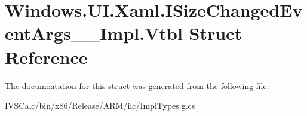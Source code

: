 \hypertarget{struct_windows_1_1_u_i_1_1_xaml_1_1_i_size_changed_event_args_____impl_1_1_vtbl}{}\section{Windows.\+U\+I.\+Xaml.\+I\+Size\+Changed\+Event\+Args\+\_\+\+\_\+\+Impl.\+Vtbl Struct Reference}
\label{struct_windows_1_1_u_i_1_1_xaml_1_1_i_size_changed_event_args_____impl_1_1_vtbl}


The documentation for this struct was generated from the following file\+:\begin{DoxyCompactItemize}
\item 
I\+V\+S\+Calc/bin/x86/\+Release/\+A\+R\+M/ilc/Impl\+Types.\+g.\+cs\end{DoxyCompactItemize}
